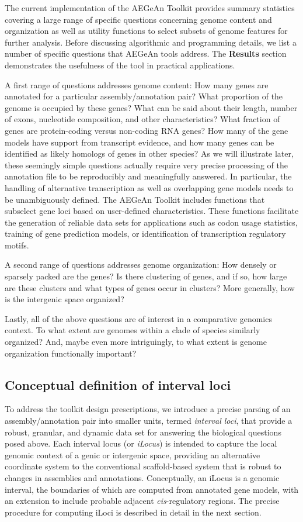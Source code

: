 The current implementation of the AEGeAn Toolkit provides summary statistics covering a large range of specific questions concerning genome content and organization as well as utility functions to select subsets of genome features for further analysis.
Before discussing algorithmic and programming details, we list a number of specific questions that AEGeAn tools address.
The \textbf{Results} section demonstrates the usefulness of the tool in practical applications.

A first range of questions addresses genome content:
How many genes are annotated for a particular assembly/annotation pair?
What proportion of the genome is occupied by these genes?
What can be said about their length, number of exons, nucleotide composition, and other characteristics?
What fraction of genes are protein-coding versus non-coding RNA genes?
How many of the gene models have support from transcript evidence, and how many genes can be identified as likely homologs of genes in other species?
As we will illustrate later, these seemingly simple questions actually require very precise processing of the annotation file to be reproducibly and meaningfully answered.
In particular, the handling of alternative transcription as well as overlapping gene models needs to be unambiguously defined.
The AEGeAn Toolkit includes functions that subselect gene loci based on user-defined characteristics.
These functions facilitate the generation of reliable data sets for applications such as codon usage statistics, training of gene prediction models, or identification of transcription regulatory motifs.

A second range of questions addresses genome organization:
How densely or sparsely packed are the genes?
Is there clustering of genes, and if so, how large are these clusters and what types of genes occur in clusters?
More generally, how is the intergenic space organized?

Lastly, all of the above questions are of interest in a comparative genomics context.
To what extent are genomes within a clade of species similarly organized?
And, maybe even more intriguingly, to what extent is genome organization functionally important?


\subsection{Conceptual definition of interval loci}
To address the toolkit design prescriptions, we introduce a precise parsing of an assembly/annotation pair into smaller units, termed \textit{interval loci}, that provide a robust, granular, and dynamic data set for answering the biological questions posed above.
Each interval locus (or \textit{iLocus}) is intended to capture the local genomic context of a genic or intergenic space, providing an alternative coordinate system to the conventional scaffold-based system that is robust to changes in assemblies and annotations.
Conceptually, an iLocus is a genomic interval, the boundaries of which are computed from annotated gene models, with an extension to include probable adjacent \textit{cis}-regulatory regions.
The precise procedure for computing iLoci is described in detail in the next section.

